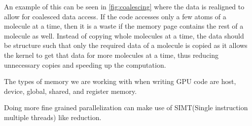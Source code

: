 An example of this can be seen in \autoref{fig:coalescing} where the data is realigned to allow for coalesced data access. If the code accesses only a few atoms of a molecule at a time, then it is a waste if the memory page contains the rest of a molecule as well. Instead of copying whole molecules at a time, the data should be structure such that only the required data of a molecule is copied as it allows the kernel to get that data for more molecules at a time, thus reducing unnecessary copies and speeding up the computation. 

The types of memory we are working with when writing GPU code are host, device, global, shared, and register memory.



Doing more fine grained parallelization can make use of SIMT(Single instruction multiple threads) like reduction.

